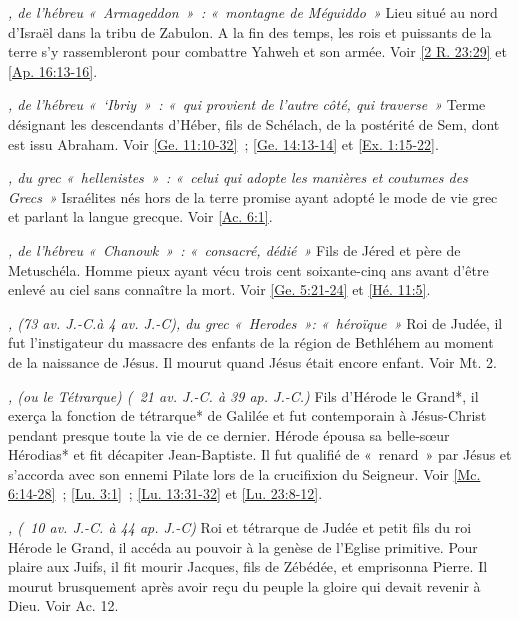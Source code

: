 \begin{multicols}{2}
\textit{, de l'hébreu «~Armageddon~»~: «~montagne de Méguiddo~»}\newline
Lieu situé au nord d'Israël dans la tribu de Zabulon. A la fin des temps, les rois et puissants de la terre s'y rassembleront pour combattre Yahweh et son armée. Voir \vref{2 R. 23:29} et \vref{Ap. 16:13-16}.

\textit{, de l'hébreu «~`Ibriy~»~: «~qui provient de l'autre côté, qui traverse~»}\newline
Terme désignant les descendants d'Héber, fils de Schélach, de la postérité de Sem, dont est issu Abraham. Voir \vref{Ge. 11:10-32}~; \vref{Ge. 14:13-14} et \vref{Ex. 1:15-22}.

\textit{, du grec «~hellenistes~»~: «~celui qui adopte les manières et coutumes des Grecs~»}\newline
Israélites nés hors de la terre promise ayant adopté le mode de vie grec et parlant la langue grecque. Voir \vref{Ac. 6:1}.

\textit{, de l'hébreu «~Chanowk~»~: «~consacré, dédié~»}\newline
Fils de Jéred et père de Metuschéla. Homme pieux ayant vécu trois cent soixante-cinq ans avant d'être enlevé au ciel sans connaître la mort. Voir \vref{Ge. 5:21-24} et \vref{Hé. 11:5}.

\textit{, (73 av. J.-C.à 4 av. J.-C), du grec «~Herodes~»: «~héroïque~»}\newline
Roi de Judée, il fut l'instigateur du massacre des enfants de la région de Bethléhem au moment de la naissance de Jésus. Il mourut quand Jésus était encore enfant. Voir Mt. 2.

\textit{, (ou le Tétrarque) (\ 21 av. J.-C. à 39 ap. J.-C.)}\newline
Fils d'Hérode le Grand*, il exerça la fonction de tétrarque* de Galilée et fut contemporain à Jésus-Christ pendant presque toute la vie de ce dernier. Hérode épousa sa belle-sœur Hérodias* et fit décapiter Jean-Baptiste. Il fut qualifié de «~renard~» par Jésus et s'accorda avec son ennemi Pilate lors de la crucifixion du Seigneur. Voir \vref{Mc. 6:14-28}~; \vref{Lu. 3:1}~; \vref{Lu. 13:31-32} et \vref{Lu. 23:8-12}.

\textit{, (\ 10 av. J.-C. à 44 ap. J.-C)}\newline
Roi et tétrarque de Judée et petit fils du roi Hérode le Grand, il accéda au pouvoir à la genèse de l'Eglise primitive. Pour plaire aux Juifs, il fit mourir Jacques, fils de Zébédée, et emprisonna Pierre. Il mourut brusquement après avoir reçu du peuple la gloire qui devait revenir à Dieu. Voir Ac. 12.


\end{multicols}
